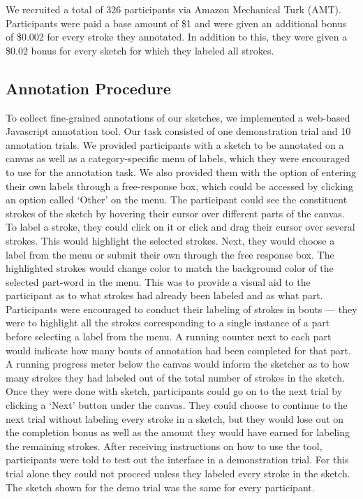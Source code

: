 \documentclass[10pt,letterpaper]{article}
\begin{document}
We recruited a total of 326 participants via Amazon Mechanical Turk (AMT). Participants were paid a base amount of \$1 and were given an additional bonus of \$0.002 for every stroke they annotated. In addition to this, they were given a \$0.02 bonus for every sketch for which they labeled all strokes. 


\subsection{Annotation Procedure}

To collect fine-grained annotations of our sketches, we implemented a web-based Javascript annotation tool. 
Our task consisted of one demonstration trial and 10 annotation trials. We provided participants with a sketch to be annotated on a canvas as well as a category-specific menu of labels, which they were encouraged to use for the annotation task. We also provided them with the option of entering their own labels through a free-response box, which could be accessed by clicking an option called ‘Other’ on the menu. 
The participant could see the constituent strokes of the sketch by hovering their cursor over different parts of the canvas.  To label a stroke, they could click on it or click and drag their cursor over several strokes. This would highlight the selected strokes. Next, they would choose a label from the menu or submit their own through the free response box. The highlighted strokes would change color to match the background color of the selected part-word in the menu. This was to provide a visual aid to the participant as to what strokes had already been labeled and as what part. Participants were encouraged to conduct their labeling of strokes in bouts — they were to highlight all the strokes corresponding to a single instance of a part before selecting a label from the menu. A running counter next to each part would indicate how many bouts of annotation had been completed for that part. A running progress meter below the canvas would inform the sketcher as to how many strokes they had labeled out of the total number of strokes in the sketch. Once they were done with sketch, participants could go on to the next trial by clicking a ‘Next’ button under the canvas. They could choose to continue to the next trial without labeling every stroke in a sketch, but they would lose out on the completion bonus as well as the amount they would have earned for labeling the remaining strokes.
After receiving instructions on how to use the tool, participants were told to test out the interface in a demonstration trial. For this trial alone they could not proceed unless they labeled every stroke in the sketch. The sketch shown for the demo trial was the same for every participant.
\end{document}
